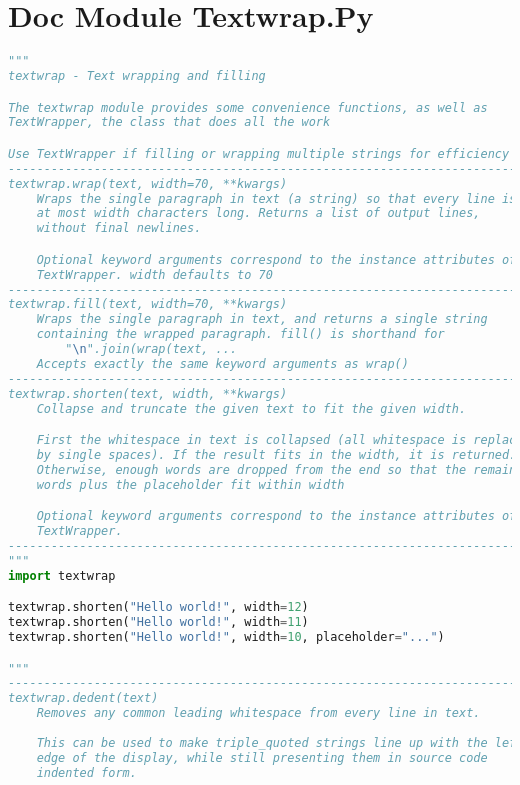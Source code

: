 \documentclass[a4paper,landscape]{report}
\begin{document}
\section{Doc Module Textwrap.Py}
\begin{lstlisting}[language=Python]
"""
textwrap - Text wrapping and filling

The textwrap module provides some convenience functions, as well as
TextWrapper, the class that does all the work

Use TextWrapper if filling or wrapping multiple strings for efficiency
------------------------------------------------------------------------
textwrap.wrap(text, width=70, **kwargs)
    Wraps the single paragraph in text (a string) so that every line is
    at most width characters long. Returns a list of output lines,
    without final newlines.

    Optional keyword arguments correspond to the instance attributes of
    TextWrapper. width defaults to 70
------------------------------------------------------------------------
textwrap.fill(text, width=70, **kwargs)
    Wraps the single paragraph in text, and returns a single string
    containing the wrapped paragraph. fill() is shorthand for
        "\n".join(wrap(text, ...
    Accepts exactly the same keyword arguments as wrap()
------------------------------------------------------------------------
textwrap.shorten(text, width, **kwargs)
    Collapse and truncate the given text to fit the given width.

    First the whitespace in text is collapsed (all whitespace is replaced
    by single spaces). If the result fits in the width, it is returned.
    Otherwise, enough words are dropped from the end so that the remaining
    words plus the placeholder fit within width

    Optional keyword arguments correspond to the instance attributes of
    TextWrapper.
------------------------------------------------------------------------
"""
import textwrap

textwrap.shorten("Hello world!", width=12)
textwrap.shorten("Hello world!", width=11)
textwrap.shorten("Hello world!", width=10, placeholder="...")

"""
------------------------------------------------------------------------
textwrap.dedent(text)
    Removes any common leading whitespace from every line in text.
    
    This can be used to make triple_quoted strings line up with the left
    edge of the display, while still presenting them in source code
    indented form.
    

\end{lstlisting}
\end{document}
